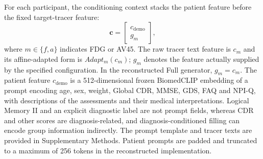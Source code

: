 For each participant, the conditioning context stacks the patient feature before the fixed target-tracer feature:
\begin{equation}
\mathbf{c}=\begin{bmatrix}c_{\mathrm{demo}}\\g_m\end{bmatrix},
\label{eq:composite_conditioning}
\end{equation}
where $m\in\{f,a\}$ indicates FDG or AV45. The raw tracer text feature is $c_m$ and its affine-adapted form is $Adapt_m(c_m)$; $g_m$ denotes the feature actually supplied by the specified configuration. In the reconstructed Full generator, $g_m=c_m$. The patient feature $c_{\mathrm{demo}}$ is a 512-dimensional frozen BiomedCLIP embedding of a prompt encoding age, sex, weight, Global CDR, MMSE, GDS, FAQ and NPI-Q, with descriptions of the assessments and their medical interpretations. Logical Memory II and an explicit diagnostic label are not prompt fields, whereas CDR and other scores are diagnosis-related, and diagnosis-conditioned filling can encode group information indirectly. The prompt template and tracer texts are provided in Supplementary Methods. Patient prompts are padded and truncated to a maximum of 256 tokens in the reconstructed implementation.

